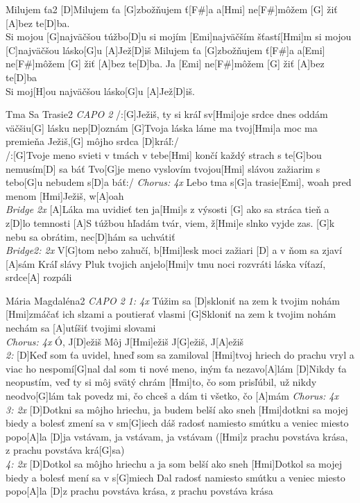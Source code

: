\documentclass[12pt]{article}
\begin{document}
\begin{song}{Milujem ťa}{2}
	[D]Milujem ťa
	[G]zbožňujem ť[F#]a
	a[Hmi] ne[F#]môžem [G] žiť [A]bez te[D]ba.
	\\
	Si mojou [G]najväčšou túžbo[D]u
	si mojím [Emi]najväčším šťastí[Hmi]m
	si mojou [C]najväčšou lásko[G]u
	[A]Jež[D]iš
	\columnbreak
	[D]Milujem ťa
	[G]zbožňujem ť[F#]a
	a[Emi] ne[F#]môžem [G] žiť [A]bez te[D]ba.
	Ja [Emi] ne[F#]môžem [G] žiť [A]bez te[D]ba
	\\
	Si moj[H]ou najväčšou lásko[G]u
	[A]Jež[D]iš.
\end{song}

\begin{song}{Tma Sa Trasie}{2}
	\textit{\color{gray}CAPO 2}
	/:[G]Ježiš, ty si kráľ
	sv[Hmi]oje srdce dnes oddám
	väčšiu[G] lásku nep[D]oznám
	[G]Tvoja láska láme ma
	tvoj[Hmi]a moc ma premieňa
	Ježiš,[G] môjho srdca [D]kráľ:/
	\\
	/:[G]Tvoje meno svieti v tmách
	v tebe[Hmi] končí každý strach
	s te[G]bou nemusím[D] sa báť
	Tvo[G]je meno vyslovím
	tvojou[Hmi] slávou zažiarim
	s tebo[G]u nebudem s[D]a báť:/
	\columnbreak
	\textit{\color{gray}Chorus: 4x}
	Lebo tma s[G]a trasie[Emi], woah
	pred menom [Hmi]Ježiš, w[A]oah
	\\
	\textit{\color{gray}Bridge 2x}
	[A]Láka ma uvidieť ten ja[Hmi]s z výsosti
	[G] ako sa stráca tieň a z[D]lo temnosti
	[A]S túžbou hľadám tvár, 
	viem, ž[Hmi]e slnko vyjde zas.
	[G]k nebu sa obrátim, nec[D]hám sa uchvátiť
	\\
	\textit{\color{gray}Bridge2: 2x}
	V[G]tom nebo zahučí, b[Hmi]lesk moci zažiari
	[D] a v ňom sa zjaví [A]sám Kráľ slávy
	Pluk tvojich anjelo[Hmi]v tmu noci rozvráti
	láska víťazí, srdce[A] rozpáli
\end{song}

\begin{song}{Mária Magdaléna}{2}
	\textit{\color{gray} CAPO 2}
	\textit{\color{gray} 1: 4x}
	Túžim sa [D]skloniť na zem k tvojim nohám
	[Hmi]zmáčať ich slzami a poutierať vlasmi
	[G]Skloniť na zem k tvojim nohám
	nechám sa [A]utíšiť tvojimi slovami
	\\
	\textit{\color{gray} Chorus: 4x}
	Ó, J[D]ežiš
	Môj J[Hmi]ežiš
	J[G]ežiš, J[A]ežiš
	\\
	\textit{\color{gray} 2:}
	[D]Keď som ťa uvidel, hneď som sa zamiloval
	[Hmi]tvoj hriech do prachu vryl a viac ho nespomí[G]nal
	dal som ti nové meno, iným ťa nezavo[A]lám
	[D]Nikdy ťa neopustím, veď ty si môj svätý chrám
	[Hmi]to, čo som prisľúbil, už nikdy neodvo[G]lám
	tak povedz mi, čo chceš a dám ti všetko, čo [A]mám
	\columnbreak
	\textit{\color{gray} Chorus: 4x}
	\\
	\textit{\color{gray} 3: 2x}
	[D]Dotkni sa môjho hriechu, ja budem belší ako sneh
	[Hmi]dotkni sa mojej biedy a bolesť zmení sa v sm[G]iech
	dáš radosť namiesto smútku a veniec miesto popo[A]la
	[D]ja vstávam, ja vstávam, ja vstávam
	([Hmi]z prachu povstáva krása, z prachu povstáva krá[G]sa)
	\\
	\textit{\color{gray} 4: 2x}
	[D]Dotkol sa môjho hriechu a ja som belší ako sneh
	[Hmi]Dotkol sa mojej biedy a bolesť mení sa v s[G]miech
	Dal radosť namiesto smútku a veniec miesto popo[A]la
	[D]z prachu povstáva krása, z prachu povstáva krása
\end{song}
\end{document}
